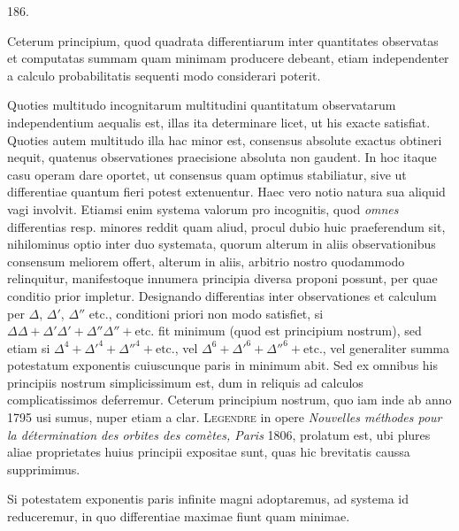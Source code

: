 \begin{center}\hypertarget{native-259-article186}{}186.\end{center}
Ceterum principium, quod quadrata differentiarum inter quantitates observatas
et computatas summam quam minimam producere debeant, etiam independenter
a calculo probabilitatis sequenti modo considerari poterit.

Quoties multitudo incognitarum multitudini quantitatum observatarum
independentium aequalis est, illas ita determinare licet, ut his exacte satisfiat.
Quoties autem multitudo illa hac minor est, consensus absolute exactus obtineri
nequit, quatenus observationes praecisione absoluta non gaudent. In hoc
itaque casu operam dare oportet, ut consensus quam optimus stabiliatur, sive
ut differentiae quantum fieri potest extenuentur. Haec vero notio natura sua
aliquid vagi involvit. Etiamsi enim systema valorum pro incognitis, quod
\emph{omnes} differentias resp. minores reddit quam aliud, procul dubio huic praeferendum
sit, nihilominus optio inter duo systemata, quorum alterum in aliis
observationibus consensum meliorem offert, alterum in aliis, arbitrio nostro
quodammodo relinquitur, manifestoque innumera principia diversa proponi
possunt, per quae conditio prior impletur. Designando differentias inter observationes
et calculum per $\Delta$, $\Delta'$, $\Delta''$ etc., conditioni priori non modo satisfiet,
si $\Delta\Delta+\Delta'\Delta'+\Delta''\Delta''+\text{etc.}$ fit minimum (quod est principium nostrum), sed etiam
si $\Delta^4+\Delta'^4+\Delta''^4+\text{etc.}$, vel $\Delta^6+\Delta'^6+\Delta''^6+\text{etc.}$, vel generaliter summa potestatum
exponentis cuiuscunque paris in minimum abit. Sed ex omnibus his
principiis nostrum simplicissimum est, dum in reliquis ad calculos complicatissimos
deferremur. Ceterum principium nostrum, quo iam inde ab anno 1795
usi sumus, nuper etiam a clar. \textsc{Legendre} in opere \emph{Nouvelles méthodes pour la
détermination des orbites des comètes, Paris} 1806, prolatum est, ubi plures aliae
proprietates huius principii expositae sunt, quas hic brevitatis caussa supprimimus.

Si potestatem exponentis paris infinite magni adoptaremus, ad systema id
reduceremur, in quo differentiae maximae fiunt quam minimae.

